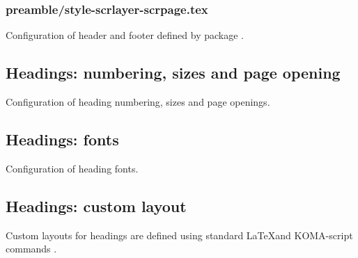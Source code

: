 \subsubsection{preamble/style-scrlayer-scrpage.tex}

Configuration of header and footer defined by package . 


\subsection{Headings: numbering, sizes and page opening}
\label{sec:style:headings}

Configuration of heading numbering, sizes and page openings.


\subsection{Headings: fonts}
\label{sec:style:headings:fonts}

Configuration of heading fonts.


\subsection{Headings: custom layout}
\label{sec:style:headings:custom}

Custom layouts for headings are defined using standard \LaTeX and KOMA-script commands .


%
%

